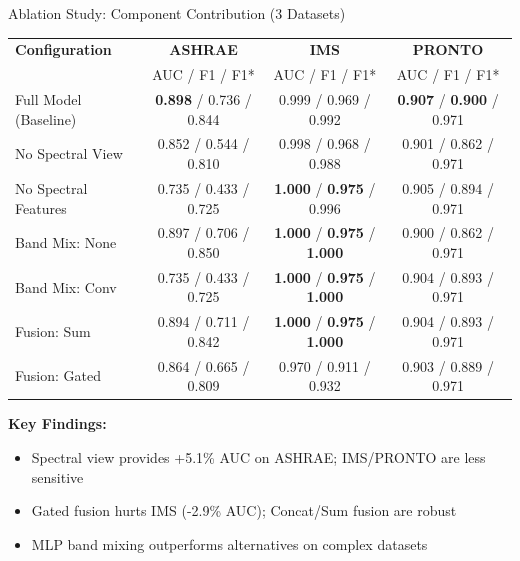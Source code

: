\documentclass[aspectratio=169,11pt]{beamer}
\begin{document}
\begin{frame}{Ablation Study: Component Contribution (3 Datasets)}
    \begin{table}[h]
        \centering
        \scriptsize
        \begin{tabular}{l|ccc}
            \toprule
            \textbf{Configuration} & \textbf{ASHRAE} & \textbf{IMS} & \textbf{PRONTO} \\
            & AUC / F1 / F1* & AUC / F1 / F1* & AUC / F1 / F1* \\
            \midrule
            Full Model (Baseline) & \textbf{0.898} / 0.736 / 0.844 & 0.999 / 0.969 / 0.992 & \textbf{0.907} / \textbf{0.900} / 0.971 \\
            \midrule
            No Spectral View & 0.852 / 0.544 / 0.810 & 0.998 / 0.968 / 0.988 & 0.901 / 0.862 / 0.971 \\
            No Spectral Features & 0.735 / 0.433 / 0.725 & \textbf{1.000} / \textbf{0.975} / 0.996 & 0.905 / 0.894 / 0.971 \\
            \midrule
            Band Mix: None & 0.897 / 0.706 / 0.850 & \textbf{1.000} / \textbf{0.975} / \textbf{1.000} & 0.900 / 0.862 / 0.971 \\
            Band Mix: Conv & 0.735 / 0.433 / 0.725 & \textbf{1.000} / \textbf{0.975} / \textbf{1.000} & 0.904 / 0.893 / 0.971 \\
            \midrule
            Fusion: Sum & 0.894 / 0.711 / 0.842 & \textbf{1.000} / \textbf{0.975} / \textbf{1.000} & 0.904 / 0.893 / 0.971 \\
            Fusion: Gated & 0.864 / 0.665 / 0.809 & 0.970 / 0.911 / 0.932 & 0.903 / 0.889 / 0.971 \\
            \bottomrule
        \end{tabular}
    \end{table}

    \vspace{0.2cm}
    \textbf{Key Findings:}
    \begin{itemize}
        \item Spectral view provides +5.1\% AUC on ASHRAE; IMS/PRONTO are less sensitive
        \item Gated fusion hurts IMS (-2.9\% AUC); Concat/Sum fusion are robust
        \item MLP band mixing outperforms alternatives on complex datasets
    \end{itemize}
\end{frame}
\end{document}
